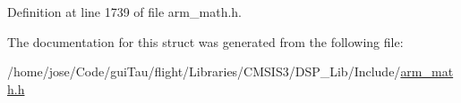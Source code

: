 Definition at line 1739 of file arm\-\_\-math.\-h.



The documentation for this struct was generated from the following file\-:\begin{DoxyCompactItemize}
\item 
/home/jose/\-Code/gui\-Tau/flight/\-Libraries/\-C\-M\-S\-I\-S3/\-D\-S\-P\-\_\-\-Lib/\-Include/\hyperlink{arm__math_8h}{arm\-\_\-math.\-h}\end{DoxyCompactItemize}
